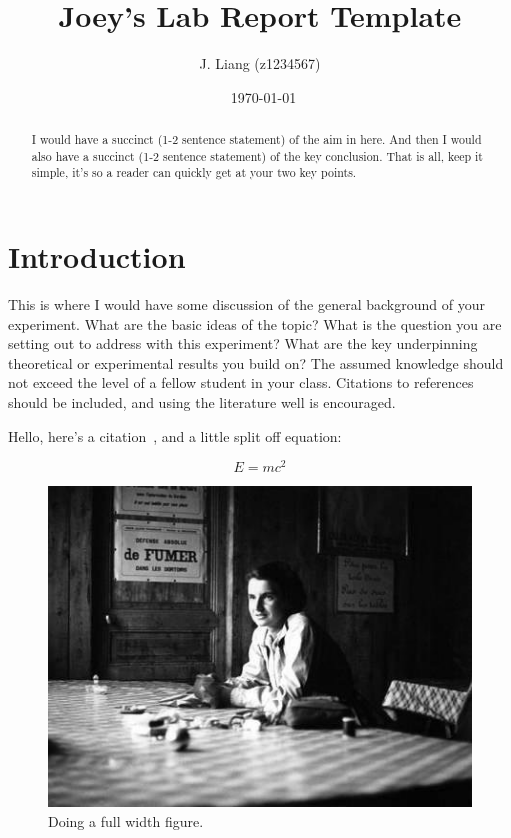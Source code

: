 \documentclass[aps,prl,reprint,10pt,amsmath,amssymb,superscriptaddress,a4paper]{revtex4-2}
\begin{document}
\title{Joey's Lab Report Template}

\author{J. Liang (z1234567)}

\date{\currenttime~\today}

\begin{abstract}
I would have a succinct (1-2 sentence statement) of the aim in here. And then I would also have a succinct (1-2 sentence statement) of the key conclusion. That is all, keep it simple, it's so a reader can quickly get at your two key points.
\end{abstract}

\maketitle

\section{Introduction}
This is where I would have some discussion of the general background of your experiment. What are the basic ideas of the topic? What is the question you are setting out to address with this experiment? What are the key underpinning theoretical or experimental results you build on? The assumed knowledge should not exceed the level of a fellow student in your class. Citations to references should be included, and using the literature well is encouraged.

\lipsum[1] %
Hello, here's a citation~\citep{Smith:2013jd}, and a little split off equation:

\begin{equation}
\label{eqn1}
E = mc^2
\end{equation}

\begin{figure}
\includegraphics[width = 16 cm]{physicist}
\caption{Doing a full width figure.}
\end{figure}
\end{document}
